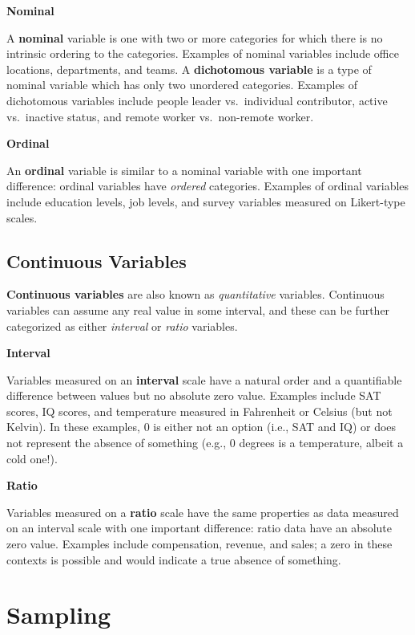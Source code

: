 \documentclass[]{book}
\begin{document}
\textbf{Nominal}

A \textbf{nominal} variable is one with two or more categories for which there is no intrinsic ordering to the categories. Examples of nominal variables include office locations, departments, and teams. A \textbf{dichotomous variable} is a type of nominal variable which has only two unordered categories. Examples of dichotomous variables include people leader vs.~individual contributor, active vs.~inactive status, and remote worker vs.~non-remote worker.

\textbf{Ordinal}

An \textbf{ordinal} variable is similar to a nominal variable with one important difference: ordinal variables have \emph{ordered} categories. Examples of ordinal variables include education levels, job levels, and survey variables measured on Likert-type scales.

\hypertarget{continuous-variables}{%
\subsection{Continuous Variables}\label{continuous-variables}}

\textbf{Continuous variables} are also known as \emph{quantitative} variables. Continuous variables can assume any real value in some interval, and these can be further categorized as either \emph{interval} or \emph{ratio} variables.

\textbf{Interval}

Variables measured on an \textbf{interval} scale have a natural order and a quantifiable difference between values but no absolute zero value. Examples include SAT scores, IQ scores, and temperature measured in Fahrenheit or Celsius (but not Kelvin). In these examples, 0 is either not an option (i.e., SAT and IQ) or does not represent the absence of something (e.g., 0 degrees is a temperature, albeit a cold one!).

\textbf{Ratio}

Variables measured on a \textbf{ratio} scale have the same properties as data measured on an interval scale with one important difference: ratio data have an absolute zero value. Examples include compensation, revenue, and sales; a zero in these contexts is possible and would indicate a true absence of something.

\hypertarget{sampling}{%
\section{Sampling}\label{sampling}}
\end{document}
